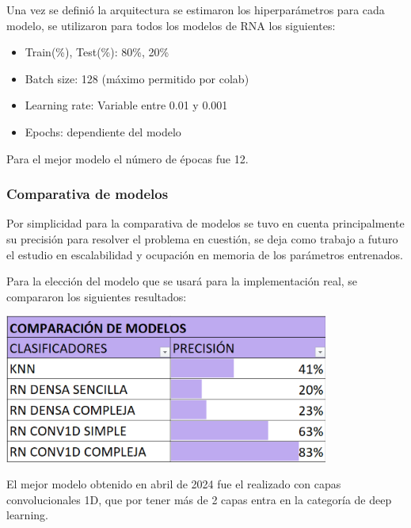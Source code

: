 Una vez se definió la arquitectura se estimaron los hiperparámetros para cada modelo, se utilizaron para todos los modelos de RNA los siguientes:
\begin{itemize}
    \item Train(\%), Test(\%): 80\%, 20\%
    \item Batch size: 128 (máximo permitido por colab)
    \item Learning rate: Variable entre 0.01 y 0.001
    \item Epochs: dependiente del modelo
\end{itemize}
Para el mejor modelo el número de épocas fue 12.
\subsubsection{Comparativa de modelos}
Por simplicidad para la comparativa de modelos se tuvo en cuenta principalmente su precisión para resolver el problema en cuestión, se deja como trabajo a futuro el estudio en escalabilidad y ocupación en memoria de los parámetros entrenados.

Para la elección del modelo que se usará para la implementación real, se compararon los siguientes resultados:
\begin{center}
    \includegraphics[width=0.8\textwidth]{ImagenesLatex/ComparacionModelos.PNG}
\end{center}

El mejor modelo obtenido en abril de 2024 fue el realizado con capas convolucionales 1D, que por tener más de 2 capas entra en la categoría de deep learning.
